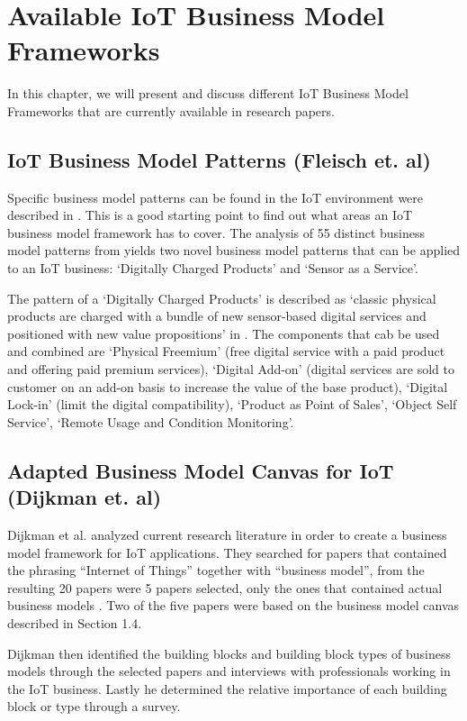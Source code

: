 \section{Available IoT Business Model Frameworks}
	In this chapter, we will present and discuss different IoT Business Model Frameworks that are currently available in research papers.
	\subsection{IoT Business Model Patterns (Fleisch et. al)}
		Specific business model patterns can be found in the IoT environment were described in \cite{fleisch}. This is a good starting point to find out what areas an IoT business model framework has to cover. The analysis of 55 distinct business model patterns from \cite{gassmann55} yields two novel business model patterns that can be applied to an IoT business: `Digitally Charged Products' and `Sensor as a Service'.

		The pattern of a `Digitally Charged Products' is described as `classic physical products are charged with a bundle
		of new sensor-based digital services and positioned with new value propositions' in \cite[p. 10]{fleisch}. The components that cab be used and combined are `Physical Freemium' (free digital service with a paid product and offering paid premium services), `Digital Add-on' (digital services are sold to customer on an add-on basis to increase the value of the base product), `Digital Lock-in' (limit the digital compatibility), `Product as Point of Sales', `Object Self Service', `Remote Usage and Condition Monitoring'. 

	\subsection{Adapted Business Model Canvas for IoT (Dijkman et. al)}
		Dijkman et al. analyzed current research literature in order to create a business model framework for IoT applications. They searched for papers that contained the phrasing ``Internet of Things'' together with ``business model'', from the resulting 20 papers were 5 papers selected, only the ones that contained actual business models \cite{dijkman}. Two of the five papers were based on the business model canvas described in Section 1.4.

		Dijkman then identified the building blocks and building block types of business models through the selected papers and interviews with professionals working in the IoT business. Lastly he determined the relative importance of each building block or type through a survey.

